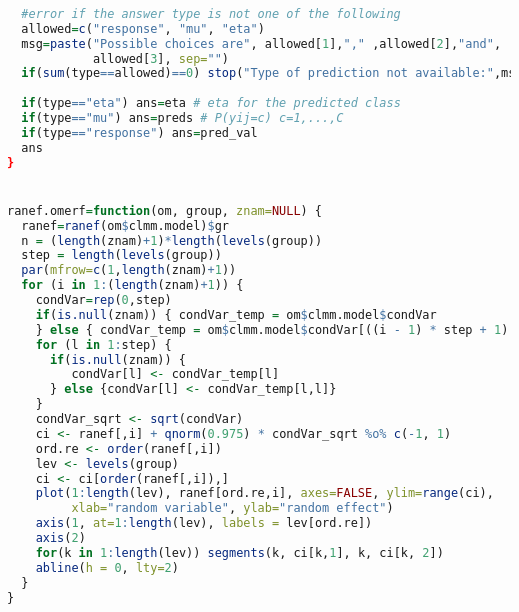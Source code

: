 \begin{lstlisting}[language=R]
  
  #error if the answer type is not one of the following
  allowed=c("response", "mu", "eta")
  msg=paste("Possible choices are", allowed[1],"," ,allowed[2],"and", 
            allowed[3], sep="")
  if(sum(type==allowed)==0) stop("Type of prediction not available:",msg)
  
  if(type=="eta") ans=eta # eta for the predicted class
  if(type=="mu") ans=preds # P(yij=c) c=1,...,C
  if(type=="response") ans=pred_val
  ans
}


ranef.omerf=function(om, group, znam=NULL) {
  ranef=ranef(om$clmm.model)$gr
  n = (length(znam)+1)*length(levels(group))
  step = length(levels(group))
  par(mfrow=c(1,length(znam)+1))
  for (i in 1:(length(znam)+1)) {
    condVar=rep(0,step)
    if(is.null(znam)) { condVar_temp = om$clmm.model$condVar
    } else { condVar_temp = om$clmm.model$condVar[((i - 1) * step + 1):(i * step),((i - 1) * step + 1):(i * step)] }
    for (l in 1:step) {
      if(is.null(znam)) { 
         condVar[l] <- condVar_temp[l]
      } else {condVar[l] <- condVar_temp[l,l]}
    }
    condVar_sqrt <- sqrt(condVar)
    ci <- ranef[,i] + qnorm(0.975) * condVar_sqrt %o% c(-1, 1)
    ord.re <- order(ranef[,i])
    lev <- levels(group)
    ci <- ci[order(ranef[,i]),]
    plot(1:length(lev), ranef[ord.re,i], axes=FALSE, ylim=range(ci),
         xlab="random variable", ylab="random effect")
    axis(1, at=1:length(lev), labels = lev[ord.re])
    axis(2)
    for(k in 1:length(lev)) segments(k, ci[k,1], k, ci[k, 2])
    abline(h = 0, lty=2)
  }
}


  
\end{lstlisting}